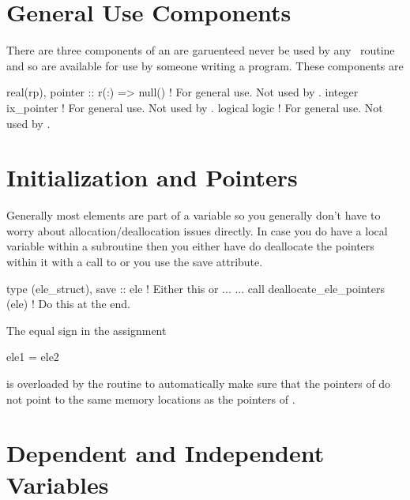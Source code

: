 {{{{{{{{{{{{{{{{{{%
\section{General Use Components}

There are three components of an  are garuenteed never be used by
any \bmad\ routine and so are available for use by someone writing a
program. These components are
\begin{example}
   real(rp), pointer :: r(:) => null()  ! For general use. Not used by \bmad. 
   integer ix_pointer                   ! For general use. Not used by \bmad.
   logical logic                        ! For general use. Not used by \bmad.
\end{example}

\section{Initialization and Pointers}

Generally most  elements are part of a
 variable so you generally don't have to worry about
allocation/deallocation issues directly. In case you do have a local
 variable within a subroutine then you either have do
deallocate the pointers within it with a call to
 or you use the save attribute.
\begin{example}
  type (ele_struct), save :: ele     ! Either this or ...
  ...
  call deallocate_ele_pointers (ele) ! Do this at the end.
\end{example}

The equal sign in the assignment
\begin{example}
  ele1 = ele2
\end{example}
is overloaded by the routine  to automatically
make sure that the pointers of  do not point to the same
memory locations as the pointers of .

\section{Dependent and Independent Variables}

}}}}}}}}}}}}}}}}}}
